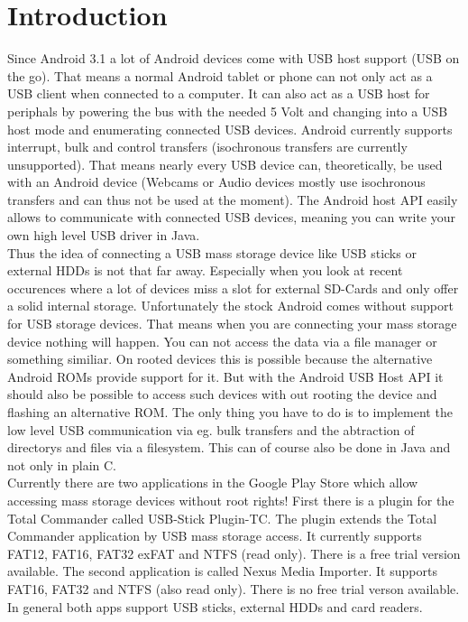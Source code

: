 \chapter{Introduction}
\label{chapter:Introduction}



Since Android 3.1 a lot of Android devices come with USB host support (USB on the go). That means a normal Android tablet or phone can not only act as a USB client when connected to a computer. It can also act as a USB host for periphals by powering the bus with the needed 5 Volt and changing into a USB host mode and enumerating connected USB devices\cite{android_usb_host}. Android currently supports interrupt, bulk and control transfers (isochronous transfers are currently unsupported). That means nearly every USB device can, theoretically, be used with an Android device (Webcams or Audio devices mostly use isochronous transfers and can thus not be used at the moment). The Android host API easily allows to communicate with connected USB devices, meaning you can write your own high level USB driver in Java.\\
Thus the idea of connecting a USB mass storage device like USB sticks or external HDDs is not that far away. Especially when you look at recent occurences where a lot of devices miss a slot for external SD-Cards and only offer a solid internal storage. Unfortunately the stock Android comes without support for USB storage devices. That means when you are connecting your mass storage device nothing will happen. You can not access the data via a file manager or something similiar. On rooted devices this is possible because the alternative Android ROMs provide support for it. But with the Android USB Host API it should also be possible to access such devices with out rooting the device and flashing an alternative ROM. The only thing you have to do is to implement the low level USB communication via eg. bulk transfers and the abtraction of directorys and files via a filesystem. This can of course also be done in Java and not only in plain C.\\
Currently there are two applications in the Google Play Store which allow accessing mass storage devices without root rights! First there is a plugin for the Total Commander called USB-Stick Plugin-TC. The plugin extends the Total Commander application by USB mass storage access. It currently supports FAT12, FAT16, FAT32 exFAT and NTFS (read only). There is a free trial version available. The second application is called Nexus Media Importer. It supports FAT16, FAT32 and NTFS (also read only). There is no free trial verson available. In general both apps support USB sticks, external HDDs and card readers.\\
